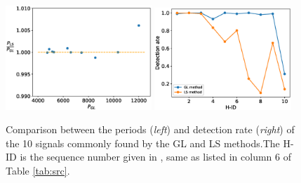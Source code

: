 \documentclass[fleqn,usenatbib]{mnras}
\begin{document}

\begin{figure}
\centering
\includegraphics[width=0.49\textwidth]{./figure/LW/P_comp.eps}
\includegraphics[width=0.46\textwidth]{./figure/sim_LW/Pdet_com.eps}
\caption{Comparison between the periods ({\it left}) and detection rate ({\it right}) of the 10 signals commonly found by the GL and LS methods.The H-ID is the sequence number given in \citet{2012ApJ...746..165H}, same as listed in column 6 of Table \ref{tab:src}. 
\label{fig:com}}
\end{figure}
\end{document}
